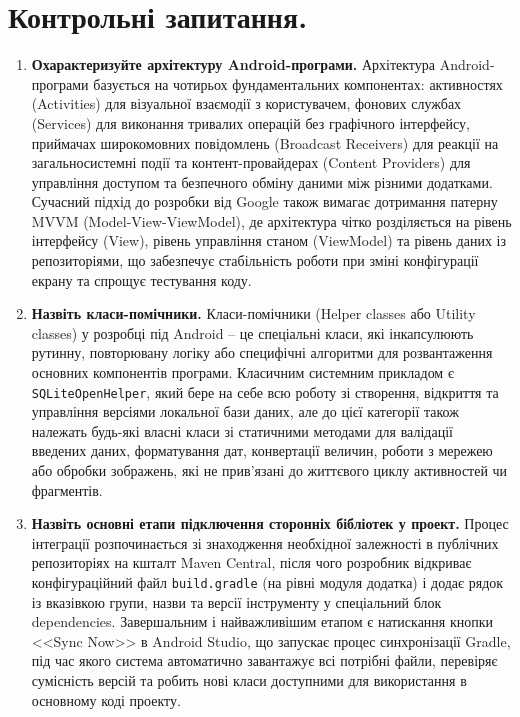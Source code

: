 \documentclass[14pt, a4paper]{extreport}
\begin{document}
	\section*{Контрольні запитання.}

	\begin{enumerate}
		\item \textbf{Охарактеризуйте архітектуру Android-програми.} Архітектура Android-програми базується на чотирьох фундаментальних компонентах: активностях (Activities) для візуальної взаємодії з користувачем, фонових службах (Services) для виконання тривалих операцій без графічного інтерфейсу, приймачах широкомовних повідомлень (Broadcast Receivers) для реакції на загальносистемні події та контент-провайдерах (Content Providers) для управління доступом та безпечного обміну даними між різними додатками. Сучасний підхід до розробки від Google також вимагає дотримання патерну MVVM (Model-View-ViewModel), де архітектура чітко розділяється на рівень інтерфейсу (View), рівень управління станом (ViewModel) та рівень даних із репозиторіями, що забезпечує стабільність роботи при зміні конфігурації екрану та спрощує тестування коду.
		
		\item \textbf{Назвіть класи-помічники.} Класи-помічники (Helper classes або Utility classes) у розробці під Android -- це спеціальні класи, які інкапсулюють рутинну, повторювану логіку або специфічні алгоритми для розвантаження основних компонентів програми. Класичним системним прикладом є \texttt{SQLiteOpenHelper}, який бере на себе всю роботу зі створення, відкриття та управління версіями локальної бази даних, але до цієї категорії також належать будь-які власні класи зі статичними методами для валідації введених даних, форматування дат, конвертації величин, роботи з мережею або обробки зображень, які не прив'язані до життєвого циклу активностей чи фрагментів.
		
		\item \textbf{Назвіть основні етапи підключення сторонніх бібліотек у проект.} Процес інтеграції розпочинається зі знаходження необхідної залежності в публічних репозиторіях на кшталт Maven Central, після чого розробник відкриває конфігураційний файл \texttt{build.gradle} (на рівні модуля додатка) і додає рядок із вказівкою групи, назви та версії інструменту у спеціальний блок dependencies. Завершальним і найважливішим етапом є натискання кнопки <<Sync Now>> в Android Studio, що запускає процес синхронізації Gradle, під час якого система автоматично завантажує всі потрібні файли, перевіряє сумісність версій та робить нові класи доступними для використання в основному коді проекту.
	\end{enumerate}
\end{document}
